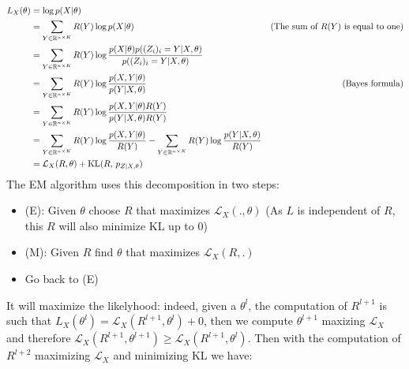 \documentclass{article}
\begin{document}
\begin{equation*}
    \begin{aligned}
        L_X(\theta) & = \log p(X | \theta)                                                                                                                     &                                            \\
                    & = \sum_{Y \in \mathbb{R}^{n\times K}} R(Y) \log p(X | \theta)                                                                                    & \text{(The sum of $R(Y)$ is equal to one)} \\
                    & = \sum_{Y \in \mathbb{R}^{n\times K}} R(Y) \log \frac{p(X | \theta)p((Z_i)_i=Y|X,\theta)}{p((Z_i)_i=Y|X, \theta)}                                &                                            \\
                    & = \sum_{Y \in \mathbb{R}^{n\times K}} R(Y) \log \frac{p(X, Y | \theta)}{p(Y|X, \theta)}                                                          & \text{(Bayes formula)}                     \\
                    & = \sum_{Y \in \mathbb{R}^{n\times K}} R(Y) \log \frac{p(X, Y | \theta)R(Y)}{p(Y|X, \theta)R(Y)}                                                  &                                            \\
                    & = \sum_{Y \in \mathbb{R}^{n\times K}} R(Y) \log \frac{p(X, Y | \theta)}{R(Y)} - \sum_{Y\in \mathbb{R}^{n\times K}} R(Y) \log \frac{p(Y|X, \theta)}{R(Y)} &                                            \\
                    & = \mathcal{L}_X(R, \theta) + \text{KL}(R,\, p_{Z|X, \theta})
    \end{aligned}
\end{equation*}
The EM algorithm uses this decomposition in two steps: \begin{itemize}
    \item (E): Given $\theta$ choose $R$ that maximizes $\mathcal{L}_X(., \theta)$ (As $L$ is independent of $R$, this $R$ will also minimize KL up to $0$)
    \item (M): Given $R$ find $\theta$ that maximizes $\mathcal{L}_X(R, .)$
    \item Go back to (E)
\end{itemize}
It will maximize the likelyhood:
indeed, given a $\theta^l$, the computation of $R^{l+1}$ is such that $L_X(\theta^l) = \mathcal{L}_X(R^{l+1}, \theta^l) + 0$, then we compute
$\theta^{l+1}$ maxizing $\mathcal{L}_X$ and therefore $\mathcal{L}_X(R^{l+1}, \theta^{l+1}) \ge \mathcal{L}_X(R^{l+1}, \theta^l)$. Then
with the computation of $R^{l+2}$ maximizing $\mathcal{L}_X$ and minimizing KL we have:
\end{document}
